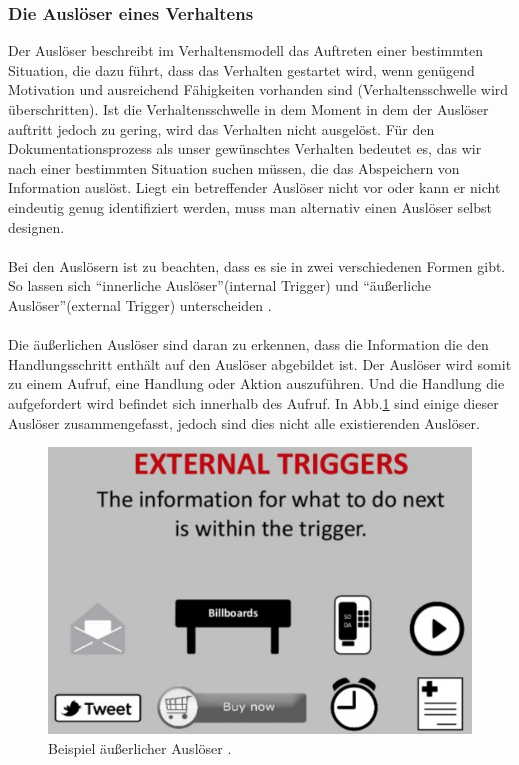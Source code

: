 \documentclass[a4paper,12pt,twoside]{scrartcl}
\begin{document}
\subsubsection{Die Auslöser eines Verhaltens}
Der Auslöser beschreibt im Verhaltensmodell das Auftreten einer bestimmten Situation, die dazu führt, dass das Verhalten gestartet wird, wenn genügend Motivation und ausreichend Fähigkeiten vorhanden sind (Verhaltensschwelle wird überschritten). Ist die Verhaltensschwelle in dem Moment in dem der Auslöser auftritt jedoch zu gering, wird das Verhalten nicht ausgelöst. Für den Dokumentationsprozess als unser gewünschtes Verhalten bedeutet es, das wir nach einer bestimmten Situation suchen müssen, die das Abspeichern von Information auslöst. Liegt ein betreffender Auslöser nicht vor oder kann er nicht eindeutig genug identifiziert werden, muss man alternativ einen Auslöser selbst designen.
\\\\
Bei den Auslösern ist zu beachten, dass es sie in zwei verschiedenen Formen gibt. So lassen sich \enquote{innerliche Auslöser}(internal Trigger) und \enquote{äußerliche Auslöser}(external Trigger) unterscheiden \cite{Eyal2014}.
\\\\
Die äußerlichen Auslöser sind daran zu erkennen, dass die Information die den Handlungsschritt enthält auf den Auslöser abgebildet ist. Der Auslöser wird somit zu einem Aufruf, eine Handlung oder Aktion auszuführen. Und die Handlung die aufgefordert wird befindet sich innerhalb des Aufruf. In Abb.\ref{externaltriggerBild} sind einige dieser Auslöser zusammengefasst, jedoch sind dies nicht alle existierenden Auslöser.
\\
\begin{figure}[h!]
\begin{center}
\includegraphics[scale = 0.4]{Bilder/externalTrigger.eps}
\caption{Beispiel äußerlicher Auslöser \cite{ExternalTrigger2018}.}
\label{externaltriggerBild}
\end{center}
\end{figure}
\end{document}
